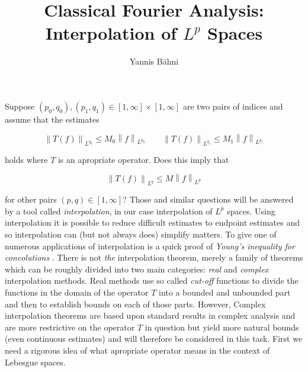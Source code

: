 


\title{Classical Fourier Analysis: Interpolation of $L^p$ Spaces}
\author{Yannis B\"{a}hni}
\address[Yannis B\"{a}hni]{University of Zurich, R\"{a}mistrasse 71, 8006 Zurich}

\maketitle


\addtocounter{section}{1}

Suppose $\left(p_0,q_0\right),\left( p_1,q_1 \right) \in [1,\infty]\times [1,\infty]$ are two pairs of indices and assume that the estimates 

\begin{equation*}
	\left\|T(f)\right\|_{L^{q_0}} \leqslant M_0\left\|f\right\|_{L^{p_0}} \qquad \left\|T(f)\right\|_{L^{q_1}} \leqslant M_1\left\|f\right\|_{L^{p_1}}
\end{equation*}

holds where $T$ is an apropriate operator. Does this imply that

\begin{equation*}
	\left\| T(f)\right\|_{L^q} \leqslant M \left\| f\right\|_{L^p}
\end{equation*}

for other pairs $\left( p,q \right) \in [1,\infty]$? Those and similar questions will be answered by a tool called \emph{interpolation}, in our case interpolation of $L^p$ spaces. Using interpolation it is possible to reduce difficult estimates to endpoint estimates and so interpolation can (but not always does) simplify matters. To give one of numerous applications of interpolation is a quick proof of \emph{Young's inequality for convolutions} \textup{\cite[22--23]{grafakos:fourier:2014}}. There is not \emph{the} interpolation theorem, merely a family of theorems which can be 
roughly divided into two main categories: \emph{real} and \emph{complex} interpolation methods. Real methods use so called \emph{cut-off} functions to divide the functions in the domain of the operator $T$ into a bounded and unbounded part and then to establish bounds on each of those parts. However, Complex interpolation theorems are based upon standard results in complex analysis and are more restrictive on the operator $T$ in question but yield more natural bounds (even continuous estimates) and will therefore be considered in this task. First we need a rigorous idea of what apropriate operator means in the context of Lebesgue spaces.

